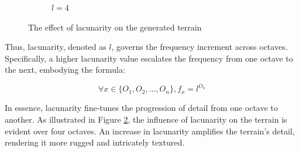 \documentclass[12pt]{article}
\begin{document}
\begin{figure}[ht]
\begin{subfigure}{0.3\textwidth}
        \caption{$l=4$}
        \label{fig:lacunarity4}
    \end{subfigure}
    \caption{The effect of lacunarity on the generated terrain}
    \label{fig:lacunarity}
\end{figure}

Thus, lacunarity, denoted as \(l\), governs the frequency increment across octaves. Specifically, a higher lacunarity value escalates the frequency from one octave to the next, embodying the formula:

$$
\forall x \in \{O_1, O_2, ..., O_n\}, f_x = l^{O_x}
$$

In essence, lacunarity fine-tunes the progression of detail from one octave to another. As illustrated in Figure \ref{fig:lacunarity}, the influence of lacunarity on the terrain is evident over four octaves. An increase in lacunarity amplifies the terrain's detail, rendering it more rugged and intricately textured.
\end{document}
